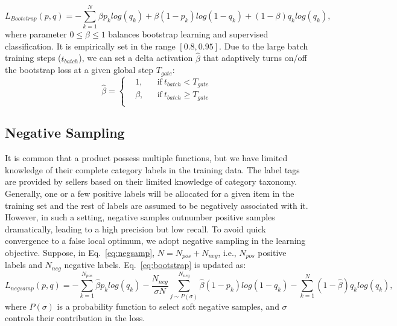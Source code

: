\documentclass[11pt,dvipsnames]{article}
\begin{document}
\begin{equation}\label{eq:bootstrap}
    L_{Bootstrap}(p,q) = -\sum_{k=1}^{N}\beta p_klog(q_k)+\beta (1-p_k)log(1-q_k)+ (1-\beta)q_klog(q_k),
\end{equation}
where parameter $0\leq\beta\leq1$ balances bootstrap learning and supervised classification. It is empirically set in the range $[0.8, 0.95]$. Due to the large batch training steps ($t_{batch}$), we can set a delta activation $\hat{\beta}$ that adaptively turns on/off the bootstrap loss at a given global step $T_{gate}$:
\begin{equation}
    \hat{\beta}= \left \{
  \begin{aligned}
    &1, && \text{if}\ t_{batch}<T_{gate}\\
    &\beta, &&\text{if}\ t_{batch}\geq T_{gate}\\
  \end{aligned} \right.
\end{equation}

\subsection{Negative Sampling}\label{sec:negsamp}
It is common that a product possess multiple functions, but we have limited knowledge of their complete category labels in the training data. The label tags are provided by sellers based on their limited knowledge of category taxonomy. Generally, one or a few positive labels will be allocated for a given item in the training set and the rest of labels are assumed to be negatively associated with it. However, in such a setting, negative samples outnumber positive samples dramatically, leading to a high precision but low recall. To avoid quick convergence to a false local optimum, we adopt negative sampling in the learning objective. Suppose, in Eq.~\ref{eq:negsamp}, $N=N_{pos}+N_{neg}$, i.e., $N_{pos}$ positive labels and $N_{neg}$ negative labels. Eq.~\ref{eq:bootstrap} is updated as:
\begin{equation}\label{eq:negsamp}
    L_{negsamp}(p,q) = -\sum_{k=1}^{N_{pos}}\hat{\beta} p_klog(q_k)-\frac{N_{neg}}{\sigma N}\sum_{j\sim P(\sigma)}^{N_{neg}}\hat{\beta} (1-p_k)log(1-q_k)- \sum_{k=1}^{N}(1-\hat{\beta})q_klog(q_k),
\end{equation}
where $P(\sigma)$ is a probability function to select soft negative samples, and $\sigma$ controls their contribution in the loss.    
\end{document}

